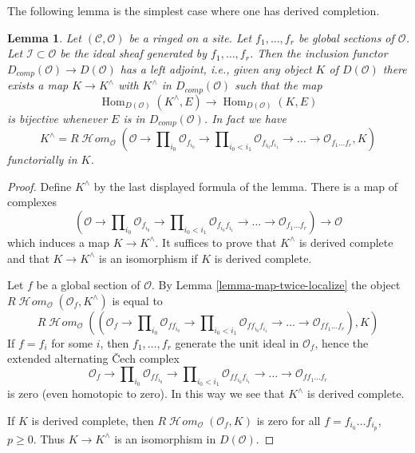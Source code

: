 \documentclass{stacks-project}
\theoremstyle{plain}
\newtheorem{lemma}[subsection]{Lemma}
\theoremstyle{definition}
\theoremstyle{remark}
\numberwithin{equation}{subsection}
\def\Hom{\mathop{\mathrm{Hom}}\nolimits}
\def\SheafHom{\mathop{\mathcal{H}\!\mathit{om}}\nolimits}
\begin{document}
\noindent
The following lemma is the simplest case where one has derived completion.

\begin{lemma}
\label{lemma-derived-completion}
Let $(\mathcal{C}, \mathcal{O})$ be a ringed on a site. Let $f_1, \ldots, f_r$
be global sections of $\mathcal{O}$. Let $\mathcal{I} \subset \mathcal{O}$ be
the ideal sheaf generated by $f_1, \ldots, f_r$.
Then the inclusion functor $D_{comp}(\mathcal{O}) \to D(\mathcal{O})$
has a left adjoint, i.e., given any object $K$ of $D(\mathcal{O})$
there exists a map $K \to K^\wedge$ with $K^\wedge$ in $D_{comp}(\mathcal{O})$
such that the map
$$
\Hom_{D(\mathcal{O})}(K^\wedge, E) \longrightarrow \Hom_{D(\mathcal{O})}(K, E)
$$
is bijective whenever $E$ is in $D_{comp}(\mathcal{O})$. In fact
we have
$$
K^\wedge =
R\SheafHom_\mathcal{O}
(\mathcal{O} \to \prod\nolimits_{i_0} \mathcal{O}_{f_{i_0}} \to
\prod\nolimits_{i_0 < i_1} \mathcal{O}_{f_{i_0}f_{i_1}} \to
\ldots \to \mathcal{O}_{f_1\ldots f_r}, K)
$$
functorially in $K$.
\end{lemma}

\begin{proof}
Define $K^\wedge$ by the last displayed formula of the lemma.
There is a map of complexes
$$
(\mathcal{O} \to \prod\nolimits_{i_0} \mathcal{O}_{f_{i_0}} \to
\prod\nolimits_{i_0 < i_1} \mathcal{O}_{f_{i_0}f_{i_1}} \to
\ldots \to \mathcal{O}_{f_1\ldots f_r}) \longrightarrow \mathcal{O}
$$
which induces a map $K \to K^\wedge$. It suffices to prove that
$K^\wedge$ is derived complete and that $K \to K^\wedge$ is an
isomorphism if $K$ is derived complete.

\medskip\noindent
Let $f$ be a global section of $\mathcal{O}$.
By Lemma \ref{lemma-map-twice-localize} the object
$R\SheafHom_\mathcal{O}(\mathcal{O}_f, K^\wedge)$
is equal to
$$
R\SheafHom_\mathcal{O}(
(\mathcal{O}_f \to \prod\nolimits_{i_0} \mathcal{O}_{ff_{i_0}} \to
\prod\nolimits_{i_0 < i_1} \mathcal{O}_{ff_{i_0}f_{i_1}} \to
\ldots \to \mathcal{O}_{ff_1\ldots f_r}), K)
$$
If $f = f_i$ for some $i$, then $f_1, \ldots, f_r$ generate the
unit ideal in $\mathcal{O}_f$, hence the extended alternating
{\v C}ech complex
$$
\mathcal{O}_f \to \prod\nolimits_{i_0} \mathcal{O}_{ff_{i_0}} \to
\prod\nolimits_{i_0 < i_1} \mathcal{O}_{ff_{i_0}f_{i_1}} \to
\ldots \to \mathcal{O}_{ff_1\ldots f_r}
$$
is zero (even homotopic to zero). In this way we see that $K^\wedge$
is derived complete.

\medskip\noindent
If $K$ is derived complete, then $R\SheafHom_\mathcal{O}(\mathcal{O}_f, K)$
is zero for all $f = f_{i_0} \ldots f_{i_p}$, $p \geq 0$. Thus
$K \to K^\wedge$ is an isomorphism in $D(\mathcal{O})$.
\end{proof}
\end{document}
